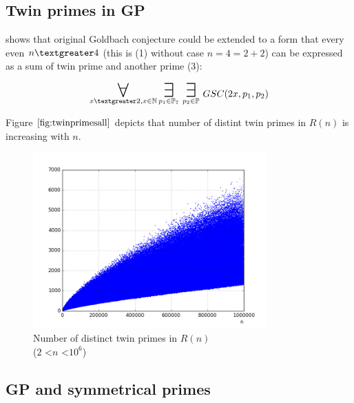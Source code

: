 \documentclass[10pt,twocolumn]{article}
\newcommand\bigforall{\mbox{\huge $\mathsurround5pt\forall$}}
\newcommand\bigexists{\mbox{\huge $\mathsurround5pt\exists$}}
\begin{document}
\subsection{Twin primes in GP}

\cite{barylski2018} shows that original Goldbach conjecture could be extended to a form that every even $n \textgreater 4$ (this is (1) without case $n = 4 = 2 + 2$) can be expressed as a sum of twin prime and another prime (3):

\begin{equation}
\displaystyle\mathop{\bigforall}_{x \textgreater 2, x \in \mathbb{N}} \displaystyle\mathop{\bigexists}_{p_1 \in \mathbb{P_T}}  \displaystyle\mathop{\bigexists}_{p_2 \in \mathbb{P}}GSC (2x, p_1, p_2)
\end{equation}

Figure $\ref{fig:twinprimesall}$ depicts that number of distint twin primes in $R(n)$ is increasing with $n$.

\begin{figure}[!ht]
\centering
\captionsetup{justification=centering}
\includegraphics[width=9cm]{f_twin_primes_all}
\caption{Number of distinct twin primes in $R(n)$ \\ ($2$ \textless $n$ \textless $10^6$)}
\label{fig:twinprimesall}
\end{figure}

\subsection{GP and symmetrical primes}
\end{document}
